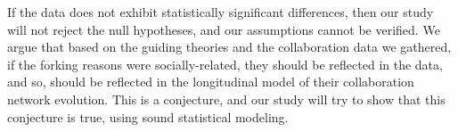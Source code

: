 \documentclass[12pt,letterpaper]{gthesis2}  %
\begin{document}
%
%
%
%


If the data does not exhibit statistically significant differences, then our study will not reject the null hypotheses, and our assumptions cannot be verified. We argue that based on the guiding theories and the collaboration data we gathered, if the forking reasons were socially-related, they should be reflected in the data, and so, should be reflected in the longitudinal model of their collaboration network evolution. This is a conjecture, and our study will try to show that this conjecture is true, using sound statistical modeling.
\end{document}
